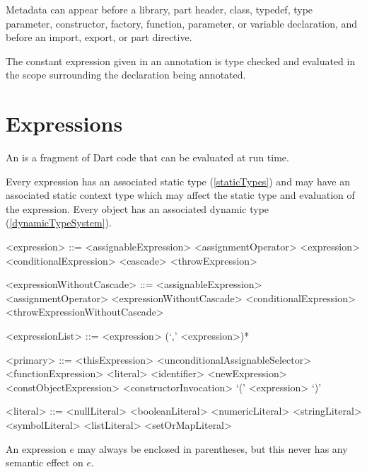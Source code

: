 \documentclass[makeidx]{article}
\begin{document}
{\LMHash{}%
Metadata can appear before a library, part header, class,
typedef, type parameter, constructor, factory, function,
parameter, or variable declaration,
and before an import, export, or part directive.

\LMHash{}%
The constant expression given in an annotation is type checked and evaluated
in the scope surrounding the declaration being annotated.


\section{Expressions}

\LMHash{}%
An  is a fragment of Dart code
that can be evaluated at run time.

\LMHash{}%
Every expression has an associated static type (\ref{staticTypes}) and
may have an associated static context type
which may affect the static type and evaluation of the expression.
Every object has an associated dynamic type (\ref{dynamicTypeSystem}).

\begin{grammar}
<expression> ::= <assignableExpression> <assignmentOperator> <expression>
  \alt <conditionalExpression>
  \alt <cascade>
  \alt <throwExpression>

<expressionWithoutCascade> ::= \gnewline{}
  <assignableExpression> <assignmentOperator> <expressionWithoutCascade>
  \alt <conditionalExpression>
  \alt <throwExpressionWithoutCascade>

<expressionList> ::= <expression> (`,' <expression>)*

<primary> ::= <thisExpression>
  \alt \SUPER{} <unconditionalAssignableSelector>
  \alt <functionExpression>
  \alt <literal>
  \alt <identifier>
  \alt <newExpression>
  \alt <constObjectExpression>
  \alt <constructorInvocation>
  \alt `(' <expression> `)'

<literal> ::= <nullLiteral>
  \alt <booleanLiteral>
  \alt <numericLiteral>
  \alt <stringLiteral>
  \alt <symbolLiteral>
  \alt <listLiteral>
  \alt <setOrMapLiteral>
\end{grammar}

\LMHash{}%
An expression $e$ may always be enclosed in parentheses, but this never has any semantic effect on $e$.

}
\end{document}

